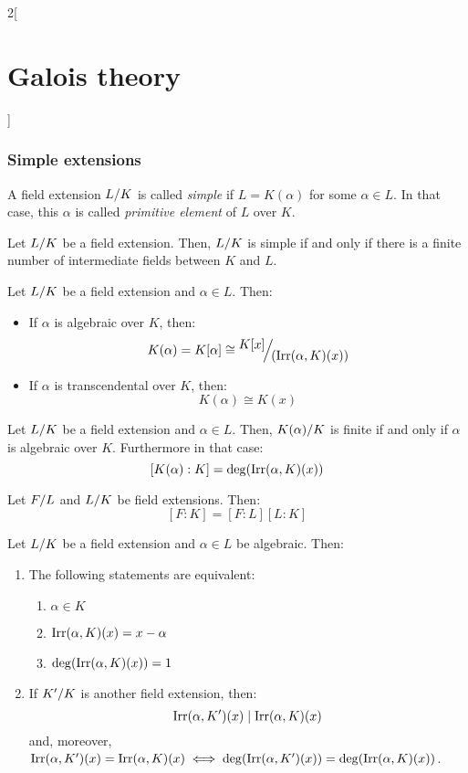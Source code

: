 \documentclass[../../../main.tex]{subfiles}
\begin{document}
\begin{multicols}{2}[\section{Galois theory}]
  \subsubsection{Simple extensions}
  \begin{definition}
    A field extension $\quot{L}{K}$ is called \textit{simple} if $L=K(\alpha)$ for some $\alpha\in L$. In that case, this $\alpha$ is called \textit{primitive element} of $L$ over $K$.
  \end{definition}
  \begin{theorem}
    Let $\quot{L}{K}$ be a field extension. Then, $\quot{L}{K}$ is simple if and only if there is a finite number of intermediate fields between $K$ and $L$.
  \end{theorem}
  \begin{prop}
    Let $\quot{L}{K}$ be a field extension and $\alpha\in L$. Then:
    \begin{itemize}
      \item If $\alpha$ is algebraic over $K$, then: $$K(\alpha)=K[\alpha]\cong\quot{K[x]}{(\irr(\alpha,K)(x))}$$
      \item If $\alpha$ is transcendental over $K$, then: $$K(\alpha)\cong K(x)$$
    \end{itemize}
  \end{prop}
  \begin{corollary}
    Let $\quot{L}{K}$ be a field extension and $\alpha\in L$. Then, $\quot{K(\alpha)}{K}$ is finite if and only if $\alpha$ is algebraic over $K$. Furthermore in that case: $$[K(\alpha):K]=\deg(\operatorname{Irr}(\alpha,K)(x))$$
  \end{corollary}
  \begin{theorem}
    Let $\quot{F}{L}$ and $\quot{L}{K}$ be field extensions. Then: $$[F:K]=[F:L][L:K]$$
  \end{theorem}
  \begin{prop}
    Let $\quot{L}{K}$ be a field extension and $\alpha\in L$ be algebraic. Then:
    \begin{enumerate}
      \item The following statements are equivalent:
            \begin{enumerate}
              \item $\alpha\in K$
              \item $\operatorname{Irr}(\alpha,K)(x)=x-\alpha$
              \item $\deg(\operatorname{Irr}(\alpha,K)(x))=1$
            \end{enumerate}
      \item If $\quot{K'}{K}$ is another field extension, then: $$\operatorname{Irr}(\alpha,K')(x)\mid\operatorname{Irr}(\alpha,K)(x)$$ and, moreover, $\operatorname{Irr}(\alpha,K')(x)=\operatorname{Irr}(\alpha,K)(x)\iff\deg(\operatorname{Irr}(\alpha,K')(x))=\deg(\operatorname{Irr}(\alpha,K)(x))$.

\end{enumerate}
\end{prop}
\end{multicols}
\end{document}
